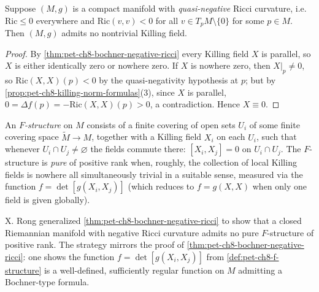\begin{theorem}[Theorem 8.2.6]
  \label{thm:pet-ch8-quasi-negative-ricci-no-killing}
  Suppose $(M,g)$ is a compact manifold with \emph{quasi-negative} Ricci
  curvature, i.e.\ $\mathrm{Ric}\le0$ everywhere and $\mathrm{Ric}(v,v)<0$ for
  all $v\in T_pM\setminus\{0\}$ for some $p\in M$. Then $(M,g)$ admits no
  nontrivial Killing field.
\end{theorem}
\begin{proof}
  By \cref{thm:pet-ch8-bochner-negative-ricci} every Killing field $X$ is
  parallel, so $X$ is either identically zero or nowhere zero. If $X$ is
  nowhere zero, then $X|_p\ne0$, so $\mathrm{Ric}(X,X)(p)<0$ by the
  quasi-negativity hypothesis at $p$; but by
  \cref{prop:pet-ch8-killing-norm-formulas}(3), since $X$ is parallel,
  $0=\Delta f(p)=-\mathrm{Ric}(X,X)(p)>0$, a contradiction. Hence $X\equiv0$.
\end{proof}

\begin{definition}[$F$-structure]
  \label{def:pet-ch8-f-structure}
  An \emph{$F$-structure} on $M$ consists of a finite covering of open sets
  $U_i$ of some finite covering space $\widetilde M\to M$, together with a
  Killing field $X_i$ on each $U_i$, such that whenever $U_i\cap U_j\ne\varnothing$
  the fields commute there: $[X_i,X_j]=0$ on $U_i\cap U_j$. The $F$-structure is
  \emph{pure} of positive rank when, roughly, the collection of local Killing
  fields is nowhere all simultaneously trivial in a suitable sense, measured via
  the function $f=\det[g(X_i,X_j)]$ (which reduces to $f=g(X,X)$ when only one
  field is given globally).
\end{definition}

\begin{remark}
  \label{rem:pet-ch8-rong-f-structure}
  X. Rong generalized \cref{thm:pet-ch8-bochner-negative-ricci} to show that a
  closed Riemannian manifold with negative Ricci curvature admits no pure
  $F$-structure of positive rank. The strategy mirrors the proof of
  \cref{thm:pet-ch8-bochner-negative-ricci}: one shows the function
  $f=\det[g(X_i,X_j)]$ from \cref{def:pet-ch8-f-structure} is a well-defined,
  sufficiently regular function on $M$ admitting a Bochner-type formula.
\end{remark}

